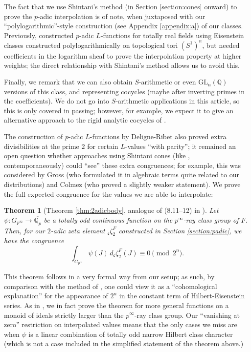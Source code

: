 \documentclass[10pt]{amsart}
\newtheorem{thm}{Theorem}[section]
\theoremstyle{definition}
\newcommand{\Q}{\mathbb{Q}}
\renewcommand{\c}{\mathfrak{c}}
\newcommand{\GL}{\mathrm{GL}}
\numberwithin{equation}{section}
\begin{document}
    The fact that we use Shintani's method (in Section \ref{section:cones} onward) to prove the $p$-adic interpolation is of note, when juxtaposed with our ``polylogarithmic''-style construction (see Appendix \ref{appendix:a}) of our classes. Previously, \cite{BKL} constructed $p$-adic $L$-functions for totally real fields using Eisenstein classes constructed polylogarithmically on topological tori $(S^1)^n$, but needed coefficients in the logarithm sheaf to prove the interpolation property at higher weights; the direct relationship with Shintani's method allows us to avoid this.

    Finally, we remark that we can also obtain $S$-arithmetic or even $\GL_n(\Q)$ versions of this class, and representing cocycles (maybe after inverting primes in the coefficients). We do not go into $S$-arithmetic applications in this article, so this is only covered in passing; however, for example, we expect it to give an alternative approach to the rigid analytic cocycles of \cite{RX2}.

    The construction of $p$-adic $L$-functions by Deligne-Ribet \cite{DR} also proved extra divisibilities at the prime $2$ for certain $L$-values ``with parity''; it remained an open question whether approaches using Shintani cones (like \cite{CN}, contemporaneously) could ``see'' these extra congruences; for example, this was considered by Gross \cite[Proposition 5.4]{Gro} (who formulated it in algebraic terms quite related to our distributions) and Colmez \cite[Théorème 3.22]{Col} (who proved a slightly weaker statement). We prove the full expected congruence for the values we are able to interpolate:
    
    \begin{thm}[Theorem \ref{thm:2adicbody}, analogue of (8.11--12) in \cite{DR}] \label{thm:2adic}
        Let $\psi:G_{p^\infty}\to \overline{\Q_p}$ be a totally odd continuous function on the $p^\infty$-ray class group of $F$. Then, for our $2$-adic zeta element ${}_\c\zeta_2^F$ constructed in Section \ref{section:padic}, we have the congruence
        \[
        \int_{G_{p^\infty}} \psi(J)\, d{}_\c\zeta_2^F(J) \equiv 0 \pmod{2^n}.
        \]
    \end{thm}
    
    This theorem follows in a very formal way from our setup; as such, by comparison with the method of \cite{DR}, one could view it as a ``cohomological explanation'' for the appearance of $2^n$ in the constant term of Hilbert-Eisenstein series. As in \cite{DR}, we in fact prove the theorem for more general functions on a monoid of ideals strictly larger than the $p^\infty$-ray class group. Our  ``vanishing at zero'' restriction on interpolated values means that the only cases we miss are when $\psi$ is a linear combination of totally odd narrow Hilbert class character (which is not a case included in the simplified statement of the theorem above.)
    
\end{document}
